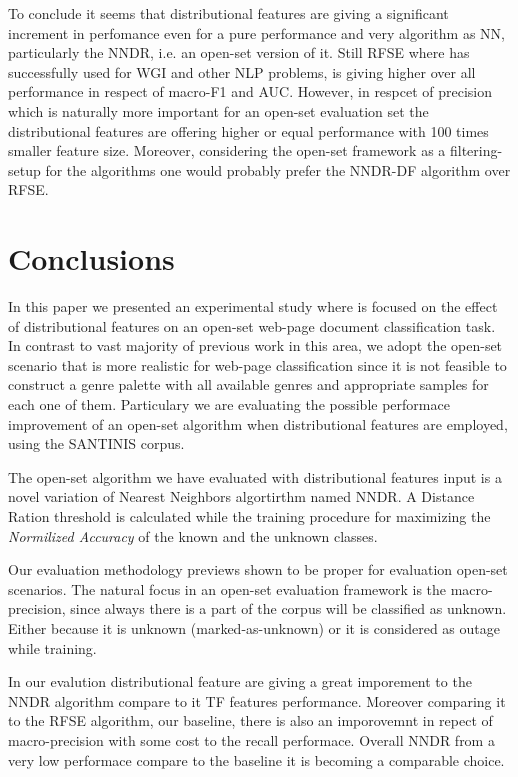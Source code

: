 \documentclass[runningheads]{llncs}
\begin{document}
To conclude it seems that distributional features are giving a significant increment in perfomance even for a pure performance and very algorithm as NN, particularly the NNDR, i.e. an open-set version of it. Still RFSE where has successfully used for  WGI and other NLP problems, is giving higher over all performance in respect of macro-F1 and AUC. However, in respcet of precision which is naturally more important for an open-set evaluation set the distributional features are offering higher or equal performance with 100 times smaller feature size. Moreover, considering the open-set framework as a filtering-setup for the algorithms one would probably prefer the NNDR-DF algorithm over RFSE.



\section{Conclusions}\label{sec:conclusions}

In this paper we presented an experimental study where is focused on the effect of distributional features on an open-set web-page document classification task. In contrast to vast majority of previous work in this area, we adopt the open-set scenario that is more realistic for  web-page classification since it is not feasible to construct a genre palette with all available genres and appropriate samples for each one of them. Particulary we are evaluating the possible performace improvement of an open-set algorithm when distributional features are employed, using the SANTINIS corpus.

The open-set algorithm we have evaluated with distributional features input is a novel variation of Nearest Neighbors algortirthm named NNDR. A Distance Ration threshold is calculated while the training procedure for maximizing the \textit{Normilized Accuracy} of the known and the unknown classes.

Our evaluation methodology previews shown to be proper for evaluation open-set scenarios. The natural focus in an open-set evaluation framework is the macro-precision, since always there is a part of the corpus will be classified as unknown. Either because it is unknown (marked-as-unknown) or it is considered as outage while training.

In our evalution distributional feature are giving a great imporement to the NNDR algorithm compare to it TF features performance. Moreover comparing it to the RFSE algorithm, our baseline, there is also an imporovemnt in repect of macro-precision with some cost to the recall performace. Overall NNDR from a very low performace compare to the baseline it is becoming a comparable choice.
\end{document}
